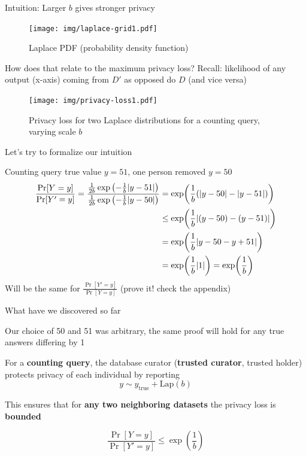 \documentclass[12pt,aspectratio=169,handout]{beamer}
\begin{document}
\begin{frame}{Intuition: Larger $b$ gives stronger privacy}

\begin{figure}
\texttt{[image: img/laplace-grid1.pdf]}
\caption{Laplace PDF (probability density function)}
\end{figure}
	
\end{frame}


\begin{frame}{How does that relate to the maximum privacy loss?}
Recall: likelihood of any output (x-axis) coming from $D'$ as opposed do $D$ (and vice versa)

\begin{figure}
\centering
\texttt{[image: img/privacy-loss1.pdf]}
\caption{Privacy loss for two Laplace distributions for a counting query, varying scale $b$}
\end{figure}

\end{frame}



\begin{frame}{Let's try to formalize our intuition}
\label{slide:proof.reference}

Counting query true value $y= 51$, one person removed $y = 50$
$$
\begin{aligned}
\frac{\Pr[Y = y]}{\Pr[Y' = y]} =
\frac{
\frac{1}{2b} \exp \left(- \frac{1}{b} \abs{y - 51} \right)
}{
\frac{1}{2b} \exp \left(- \frac{1}{b} \abs{y - 50} \right) 
}
&= \exp (\frac{1}{b} ( \abs{y - 50} - \abs{y - 51} ) ) \\
&\leq \exp (\frac{1}{b} \abs{(y - 50) - (y - 51)} ) \\
&= \exp (\frac{1}{b} \abs{y - 50 - y + 51} ) \\
&= \exp (\frac{1}{b} \abs{1}) = \exp(\frac{1}{b}) \\
\end{aligned}
$$
Will be the same for $\frac{\Pr[Y' = y]}{\Pr[Y = y]}$ (prove it! check the appendix)

\end{frame}







\begin{frame}{What have we discovered so far}

Our choice of 50 and 51 was arbitrary, the same proof will hold for any true answers differing by 1

For a \textbf{counting query}, the database curator (\textbf{trusted curator}, trusted holder) protects privacy of each individual by reporting
$$y \sim y_{\mathrm{true}} + \textrm{Lap}(b)$$

This ensures that for \textbf{any two neighboring datasets} the privacy loss is \textbf{bounded}

$$
\frac{\Pr[Y = y]}{\Pr[Y' = y]} \leq \exp(\frac{1}{b})
$$

\end{frame}
\end{document}
